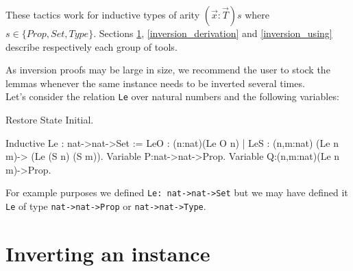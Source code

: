 These tactics work for inductive types of arity $(\vec{x}:\vec{T})s$ 
where $s \in \{Prop,Set,Type\}$. Sections \ref{inversion_primitive},
\ref{inversion_derivation} and \ref{inversion_using} 
describe respectively each group of tools.

As inversion proofs may be large in size, we recommend the user to
stock the lemmas whenever the same instance needs to be inverted
several times.\\

Let's consider the relation \texttt{Le} over natural numbers and the
following variables:

\begin{coq_eval}
Restore State Initial.
\end{coq_eval}

\begin{coq_example*}
Inductive Le : nat->nat->Set :=
  LeO : (n:nat)(Le O n)  |  LeS : (n,m:nat) (Le n m)-> (Le (S n) (S m)).
Variable P:nat->nat->Prop.
Variable Q:(n,m:nat)(Le n m)->Prop.
\end{coq_example*}

For example purposes we defined  \verb+Le: nat->nat->Set+
 but we may have defined
it \texttt{Le} of type \verb+nat->nat->Prop+ or \verb+nat->nat->Type+.


\section{Inverting an instance}
\label{inversion_primitive}
